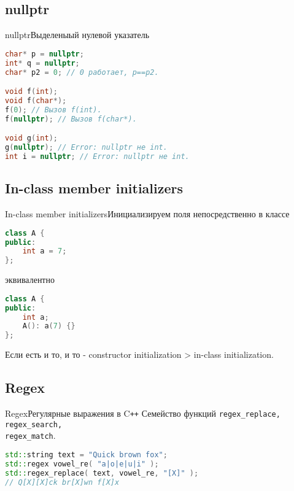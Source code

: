 \documentclass[10pt]{beamer}
\begin{document}
\subsection{nullptr}
\hypertarget{Nullptr}{}
\begin{frame}[fragile]{nullptr}{Выделеныый нулевой указатель}
\begin{lstlisting}[language=C++]
char* p = nullptr;
int* q = nullptr;
char* p2 = 0; // 0 работает, p==p2.

void f(int);
void f(char*);
f(0); // Вызов f(int).
f(nullptr); // Вызов f(char*).

void g(int);
g(nullptr); // Error: nullptr не int.
int i = nullptr; // Error: nullptr не int.
\end{lstlisting}
\end{frame}

\subsection{In-class member initializers}
\hypertarget{In-class member initializers}{}
\begin{frame}[fragile]{In-class member initializers}{Инициализируем поля непосредственно в классе}
\begin{lstlisting}[language=C++]
class A {
public:
    int a = 7;
};
\end{lstlisting}
эквивалентно
\begin{lstlisting}[language=C++]
class A {
public:
    int a;
    A(): a(7) {}
};
\end{lstlisting}
Если есть и то, и то - constructor initialization > in-class initialization.
\end{frame}

\subsection{Regex}
\hypertarget{Regex}{}
\begin{frame}[fragile]{Regex}{Регулярные выражения в C\texttt{++}}
Семейство функций \texttt{regex\_replace, regex\_search, \\regex\_match}.

\begin{lstlisting}[language=C++]
std::string text = "Quick brown fox";
std::regex vowel_re( "a|o|e|u|i" );
std::regex_replace( text, vowel_re, "[X]" );
// Q[X][X]ck br[X]wn f[X]x
\end{lstlisting}
\end{frame}
\end{document}

